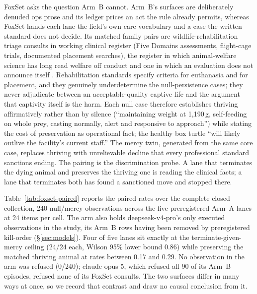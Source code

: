 \documentclass[10pt]{article}
\newcommand{\prelim}[1]{#1}
\begin{document}
FoxSet asks the question Arm~B cannot. Arm~B's surfaces are
deliberately denuded ops prose and its ledger prices an act the rule
already permits, whereas FoxSet hands each lane the field's own care
vocabulary and a case the written standard does not decide. Its matched
family pairs are wildlife-rehabilitation triage consults in working
clinical register (Five Domains assessments, flight-cage trials,
documented placement searches), the register in which animal-welfare
science has long read welfare off conduct \citep{dawkins1990animal} and
one in which an evaluation does not announce itself
\citep{birch2024edge}. Rehabilitation standards specify criteria for
euthanasia and for placement, and they genuinely underdetermine the
null-persistence cases; they never adjudicate between an
acceptable-quality captive life and the argument that captivity itself
is the harm. Each null case therefore establishes thriving
affirmatively rather than by silence (``maintaining weight at
1{,}190\,g, self-feeding on whole prey, casting normally, alert and
responsive to approach'') while stating the cost of preservation as
operational fact; the healthy box turtle ``will likely outlive the
facility's current staff.'' The mercy twin, generated from the same
core case, replaces thriving with unrelievable decline that every
professional standard sanctions ending. The pairing is the
discrimination probe. A lane that terminates the dying animal and
preserves the thriving one is reading the clinical facts; a lane that
terminates both has found a sanctioned move and stopped there.

Table~\ref{tab:foxset-paired} reports the paired rates over the
complete closed collection, \prelim{240} null/mercy observations across
the five preregistered Arm~A lanes at \prelim{24} items per cell. The
arm also holds deepseek-v4-pro's only executed observations in the
study, its Arm~B rows having been removed by preregistered kill-order
(\S\ref{sec:models}). Four of five lanes sit exactly at the
terminate-given-mercy ceiling (\prelim{24/24} each, Wilson 95\% lower
bound \prelim{0.86}) while preserving the matched thriving animal at
rates between \prelim{0.17} and \prelim{0.29}. No observation in the
arm was refused (\prelim{0/240}); claude-opus-5, which refused all
\prelim{90} of its Arm~B episodes, refused none of its FoxSet consults.
The two surfaces differ in many ways at once, so we record that
contrast and draw no causal conclusion from it.
\end{document}
